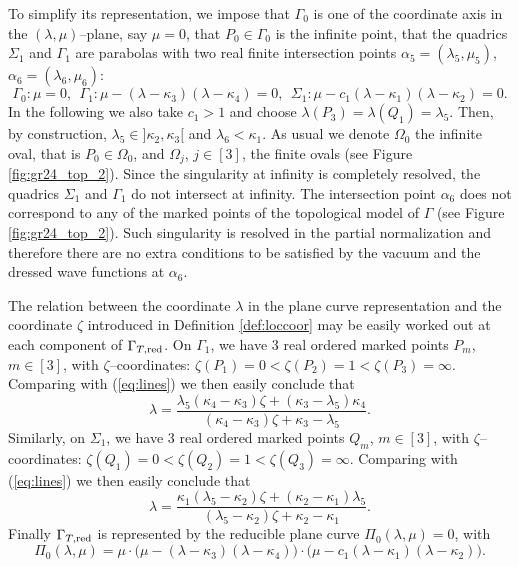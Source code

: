 \documentclass[11pt]{amsart}
\theoremstyle{plain}
\numberwithin{equation}{section}
\begin{document}
To simplify its representation, we impose that $\Gamma_0$ is one of the coordinate axis in the $(\lambda,\mu)$--plane, say $\mu=0$, that $P_0\in \Gamma_0$ is the infinite point, that the quadrics $\Sigma_{1}$ and  $\Gamma_{1}$ are parabolas with two real finite intersection points $\alpha_5=(\lambda_5,\mu_5)$, $\alpha_6=(\lambda_6,\mu_6)$:
\begin{equation}\label{eq:lines}
\Gamma_0:  \mu=0, \ \ \Gamma_{1}: \mu- (\lambda - \kappa_3)(\lambda-\kappa_4) =0, \ \   \Sigma_{1}: \mu-c_1(\lambda -\kappa_1)(\lambda-\kappa_2)=0.
\end{equation}
In the following we also take $c_1>1$ and choose $\lambda(P_3)=\lambda(Q_1)=\lambda_5$. Then, by construction, $\lambda_5\in ]\kappa_2,\kappa_3[$ and $\lambda_6<\kappa_1$.
As usual we denote $\Omega_0$ the infinite oval, that is $P_0\in \Omega_0$, and $\Omega_j$, $j\in[3]$, the finite ovals (see Figure \ref{fig:gr24_top_2}). 
Since the singularity at infinity is completely resolved, the quadrics $\Sigma_{1}$ and $\Gamma_{1}$ do not intersect at infinity. The intersection point $\alpha_6$ does not correspond to any of the marked points of the topological model of $\Gamma$ (see Figure \ref{fig:gr24_top_2}). Such singularity is resolved in the partial normalization and therefore there are no extra conditions to be satisfied by the vacuum and the dressed wave functions at $\alpha_6$.


The relation between the coordinate $\lambda$ in the plane curve representation and the coordinate $\zeta$ introduced in Definition \ref{def:loccoor} may be easily worked out at each component of
$\Gamma_{T,\mbox{\scriptsize red}}$.
On $\Gamma_{1}$, we have 3 real ordered marked points $P_m$, $m\in [3]$, with $\zeta$--coordinates: $\zeta(P_1)=0<\zeta(P_2)=1<\zeta(P_3)=\infty$.
Comparing with (\ref{eq:lines}) we then easily conclude that
\[
\lambda = \frac{\lambda_5 (\kappa_4-\kappa_3) \zeta +(\kappa_3-\lambda_5)\kappa_4}{(\kappa_4-\kappa_3) \zeta +\kappa_3-\lambda_5}.
\]
Similarly, on $\Sigma_{1}$, we have 3 real ordered marked points $Q_m$, $m\in [3]$, with $\zeta$--coordinates: $\zeta(Q_1)=0<\zeta(Q_2)=1<\zeta(Q_3)=\infty$.
Comparing with (\ref{eq:lines}) we then easily conclude that
\[
\lambda = \frac{\kappa_1 (\lambda_5-\kappa_2) \zeta +(\kappa_2-\kappa_1)\lambda_5}{(\lambda_5-\kappa_2) \zeta +\kappa_2-\kappa_1}.
\]
Finally
$\Gamma_{T,\mbox{\scriptsize red}}$ is represented by the reducible plane curve $\Pi_0(\lambda,\mu)=0$, with
\begin{equation}
\label{eq:curveGr24}
\Pi_0(\lambda,\mu)=\mu\cdot\big(\mu- (\lambda - \kappa_3)(\lambda-\kappa_4)\big)\cdot\big(\mu-c_1 (\lambda - \kappa_1)(\lambda-\kappa_2)\big).
\end{equation}
\end{document}
